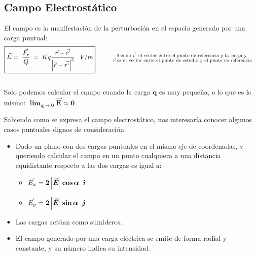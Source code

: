 \subsection{Campo Electrostático}
\noindent El campo es la manifestación de la perturbación en el espacio generado por una carga puntual:
\[
        \boxed{\vec{E} = \hspace{1mm}\frac{\vec{F_e}}{Q} \hspace{1mm}= \hspace{1mm} Kq\frac{\vec{r} -\vec{r`}}{\left | \vec{r} -\vec{r`} \right |^3} \hspace{3mm}V/m} \hspace{1cm}
        \substack{\textnormal{Siendo \(\vec{r`}\) el vector entre el punto de referencia y la carga y }
                \\
                \textnormal{\(\vec{r}\) es el vector entre el punto de estudio y el punto de referencia}
        }
\]
\\
Solo podemos calcular el campo cuando la carga \(\bm{q}\) es muy pequeña, o lo que es lo mismo: \(\bm{\lim_{q \to 0} \vec{E} \approx 0}\) \par
\vspace{0.5cm}
\noindent Sabiendo como se expresa el campo electrostático, nos interesaría conocer algunos casos puntuales dignos de consideración:
\begin{itemize}
        \item Dado un plano con dos cargas puntuales en el mismo eje de coordenadas, y queriendo calcular el campo en un punto cualquiera a una distancia equidistante respecto a las dos cargas es igual a:
              \begin{itemize}
                      \item \(\vec{E_x} = \bm{2\left | \vec{E} \right | \cos{\bm{\alpha}}}\hspace{2mm} \bm{\hat{\imath}}\)
                      \item \(\vec{E_y} = \bm{2\left | \vec{E} \right | \sin{\bm{\alpha}}} \hspace{2mm} \bm{\hat{\jmath}}\)
              \end{itemize}
        \item Las cargas actúan como sumideros.
        \item El campo generado por una carga eléctrica se emite de forma radial y constante, y su número indica su intensidad.
\end{itemize}
